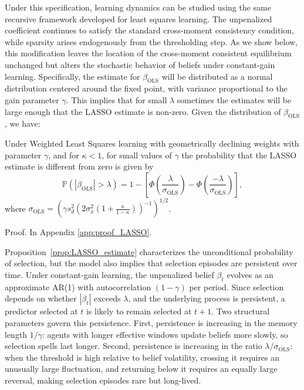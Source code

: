 Under this specification, learning dynamics can be studied using the same recursive framework developed for least squares learning. The unpenalized coefficient continues to satisfy the standard cross-moment consistency condition, while sparsity arises endogenously from the thresholding step. As we show below, this modification leaves the location of the cross-moment consistent equilibrium unchanged but alters the stochastic behavior of beliefs under constant-gain learning.
Specifically, the estimate for $\beta_{\text{OLS}}$ will be distributed as a normal distribution centered around the fixed point, with variance proportional to the gain parameter $\gamma$. 
This implies that for small $\lambda$ sometimes the estimates will be large enough that the LASSO estimate is non-zero. 
Given the distribution of $\beta_{\text{OLS}}$, we have: 
\begin{proposition}\label{prop:LASSO_estimate}
     Under Weighted Least Squares learning with geometrically declining weights with parameter $\gamma$, and for $\kappa < 1$, for small values of $\gamma$ the probability that the LASSO estimate is different from zero is given by 
     \begin{equation} \mathbb{P}(|{\beta}_{\text{OLS}}| > \lambda) = 1 - \left[\Phi\left(\frac{\lambda}{\sigma_{\text{OLS}}}\right) - \Phi\left(\frac{-\lambda}{\sigma_{\text{OLS}}}\right)\right], \end{equation} where $\sigma_{\text{OLS}} = \left(\gamma s_{d}^2 \left(2 \sigma^2_x \left(1 + \frac{\kappa}{1 - \kappa} \right)\right)^{-1}\right)^{1/2}$.
\end{proposition}

Proof. In Appendix \ref{app:proof_LASSO}.

\begin{remark}\label{rem:persistence}
Proposition~\ref{prop:LASSO_estimate} characterizes the unconditional probability of selection, but the model also implies that selection episodes are persistent over time.
Under constant-gain learning, the unpenalized belief $\beta_t$ evolves as an approximate AR(1) with autocorrelation $(1-\gamma)$ per period.
Since selection depends on whether $|\beta_t|$ exceeds $\lambda$, and the underlying process is persistent, a predictor selected at $t$ is likely to remain selected at $t+1$.
Two structural parameters govern this persistence.
First, persistence is increasing in the memory length $1/\gamma$: agents with longer effective windows update beliefs more slowly, so selection spells last longer.
Second, persistence is increasing in the ratio $\lambda/\sigma_{\text{OLS}}$: when the threshold is high relative to belief volatility, crossing it requires an unusually large fluctuation, and returning below it requires an equally large reversal, making selection episodes rare but long-lived.
\end{remark}

